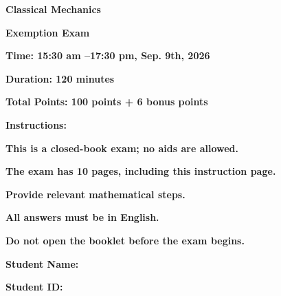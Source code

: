 \documentclass[11pt, a4paper]{article} %
\begin{document}

\setlength{\parindent}{0pt} %
\onehalfspacing %

\vspace*{0.1cm}

\begin{center}
	{\Large \textbf{Classical Mechanics}}
    \vspace*{2mm}

    {\Large \textbf{Exemption Exam }}
	\vspace{8mm}

{\Large \textbf{Time: 15:30 am --17:30 pm, Sep. 9th, 2026}}
\vspace*{2mm}

{\Large \textbf{Duration: 120 minutes}}
\vspace*{2mm}

{\Large \textbf{Total Points: 100 points + 6 bonus points}}
\end{center}
\vspace*{8mm}

{\Large \textbf{Instructions:}}
\vspace*{2mm}

{\Large \textbf{This is a closed-book exam; no aids are allowed.}}
\vspace*{2mm}

{\Large \textbf{The exam has 10 pages, including this instruction page.}}
\vspace*{2mm}

{\Large \textbf{Provide relevant mathematical steps.}}
\vspace*{2mm}

{\Large \textbf{All answers must be in English.}}
\vspace*{2mm}

{\Large \textbf{Do not open the booklet before the exam begins.}}
\vspace{5cm}

\begin{center}
{\Large \textbf{Student Name:} \underline{\hspace{4cm}}}
\vspace*{8mm}

{\Large \textbf{Student ID:} \underline{\hspace{4cm}}}
\vspace*{2mm}
\end{center}

\newpage
\end{document}
